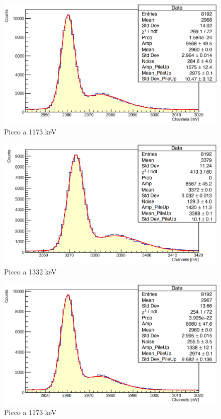 \documentclass[a4paper,10pt]{article}
\begin{document}
\begin{figure}[H]
    \centering
    \includegraphics[scale=0.45]{appendice/spettri/CoCu1_44}
    \caption{Picco a 1173 keV}
\end{figure}
\begin{figure}[H]
    \centering
    \includegraphics[scale=0.45]{appendice/spettri/CoCu2_44}
    \caption{Picco a 1332 keV}
\end{figure}
\begin{figure}[H]
    \centering
    \includegraphics[scale=0.45]{appendice/spettri/CoCu1_54}
    \caption{Picco a 1173 keV}
\end{figure}
\end{document}
